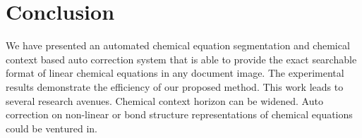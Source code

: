 \documentclass[conference]{IEEEtran}
\begin{document}
\section{Conclusion}
We have presented an automated chemical equation segmentation and chemical context based auto correction system that is able to provide the exact searchable format of linear chemical equations in any document image. The experimental results demonstrate the efficiency of our proposed method. This work leads to several research avenues. Chemical context horizon can be widened. Auto correction on non-linear or bond structure representations of chemical equations could be ventured in.
\end{document}
